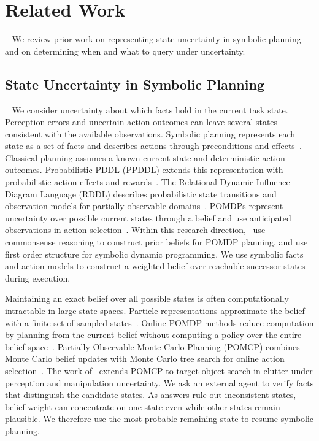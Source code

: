 \section{Related Work}~\label{related}
We review prior work on representing state uncertainty in symbolic planning and on determining when and what to query under uncertainty.

\subsection{State Uncertainty in Symbolic Planning}~\label{rel:state_uncertainty}
We consider uncertainty about which facts hold in the current task state. Perception errors and uncertain action outcomes can leave several states consistent with the available observations. Symbolic planning represents each state as a set of facts and describes actions through preconditions and effects~\citep{fikes1971strips,mcdermott1998pddl}. Classical planning assumes a known current state and deterministic action outcomes. Probabilistic PDDL (PPDDL) extends this representation with probabilistic action effects and rewards~\citep{younes2004ppddl1}. The Relational Dynamic Influence Diagram Language (RDDL) describes probabilistic state transitions and observation models for partially observable domains~\citep{sanner2010rddl}. POMDPs represent uncertainty over possible current states through a belief and use anticipated observations in action selection~\citep{kaelbling1998planning}. Within this research direction,~\citet{zhang2015corpp} use commonsense reasoning to construct prior beliefs for POMDP planning, and \citet{sanner2010symbolic} use first order structure for symbolic dynamic programming. We use symbolic facts and action models to construct a weighted belief over reachable successor states during execution.


Maintaining an exact belief over all possible states is often computationally intractable in large state spaces. Particle representations approximate the belief with a finite set of sampled states~\citep{thrun2005probabilistic}. Online POMDP methods reduce computation by planning from the current belief without computing a policy over the entire belief space~\citep{ross2008online}. Partially Observable Monte Carlo Planning (POMCP) combines Monte Carlo belief updates with Monte Carlo tree search for online action selection~\citep{silver2010monte}. The work of~\citet{xiao2019objectsearch} extends POMCP to target object search in clutter under perception and manipulation uncertainty. 
We ask an external agent to verify facts that distinguish the candidate states. As answers rule out inconsistent states, belief weight can concentrate on one state even while other states remain plausible. We therefore use the most probable remaining state to resume symbolic planning.



